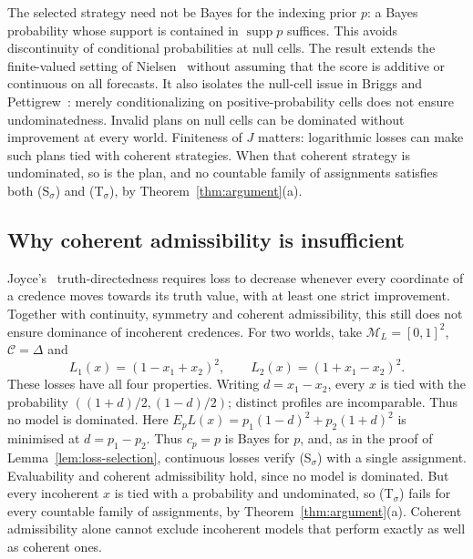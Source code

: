 \documentclass[11pt]{article}
\theoremstyle{definition}
\theoremstyle{remark}
\newcommand{\M}{\mathcal M}
\newcommand{\C}{\mathcal C}
\newcommand{\supp}{\operatorname{supp}}
\begin{document}
The selected strategy need not be Bayes for the indexing prior $p$: a Bayes probability whose support is contained in $\supp p$ suffices. This avoids discontinuity of conditional probabilities at null cells. The result extends the finite-valued setting of Nielsen~\cite{Nielsen2021} without assuming that the score is additive or continuous on all forecasts. It also isolates the null-cell issue in Briggs and Pettigrew~\cite{Briggs2020}: merely conditionalizing on positive-probability cells does not ensure undominatedness. Invalid plans on null cells can be dominated without improvement at every world. Finiteness of $J$ matters: logarithmic losses can make such plans tied with coherent strategies. {\color{red}When that coherent strategy is undominated, so is the plan, and no countable family of assignments satisfies both (S$_\sigma$) and (T$_\sigma$), by Theorem~\ref{thm:argument}(a).}

\subsection{Why coherent admissibility is insufficient}
Joyce's~\cite{Joyce2009} truth-directedness requires loss to decrease whenever every coordinate of a credence moves towards its truth value, with at least one strict improvement. Together with continuity, symmetry and coherent admissibility, this still does not ensure dominance of incoherent credences. For two worlds, take $\M_L=[0,1]^2$, $\C=\Delta$ and
\[
L_1(x)=(1-x_1+x_2)^2,\qquad L_2(x)=(1+x_1-x_2)^2.
\]
These losses have all four properties. Writing $d=x_1-x_2$, every $x$ is tied with the probability $((1+d)/2,(1-d)/2)$; distinct profiles are incomparable. Thus no model is dominated. Here $E_pL(x)=p_1(1-d)^2+p_2(1+d)^2$ is minimised at $d=p_1-p_2$. {\color{red}Thus $c_p=p$ is Bayes for $p$, and, as in the proof of Lemma~\ref{lem:loss-selection}, continuous losses verify (S$_\sigma$) with a single assignment. Evaluability and coherent admissibility hold, since no model is dominated. But every incoherent $x$ is tied with a probability and undominated, so (T$_\sigma$) fails for every countable family of assignments, by Theorem~\ref{thm:argument}(a).} Coherent admissibility alone cannot exclude incoherent models that perform exactly as well as coherent ones.
\end{document}
